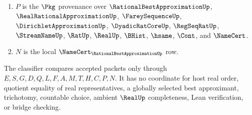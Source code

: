 \begin{definition}
\begin{enumerate}
$$
E,S,G,D,L,F,A,Q,M,T \longmapsto H,P,N .
$$
\item $P$ is the $\Pkg$ provenance over $\RationalBestApproximationUp$, $\RealRationalApproximationUp$, $\FareySequenceUp$, $\DirichletApproximationUp$, $\DyadicRatCoreUp$, $\RegSeqRatUp$, $\StreamNameUp$, $\RatUp$, $\RealUp$, $\BHist$, $\hsame$, $\Cont$, and $\NameCert$.
\item $N$ is the local $\NameCert_{\RationalBestApproximationUp}$ row.
\end{enumerate}
The classifier compares accepted packets only through $E,S,G,D,Q,L,F,A,M,T,H,C,P,N$. It has no coordinate for host real order, quotient equality of real representatives, a globally selected best approximant, trichotomy, countable choice, ambient $\RealUp$ completeness, Lean verification, or bridge checking.
\end{definition}

